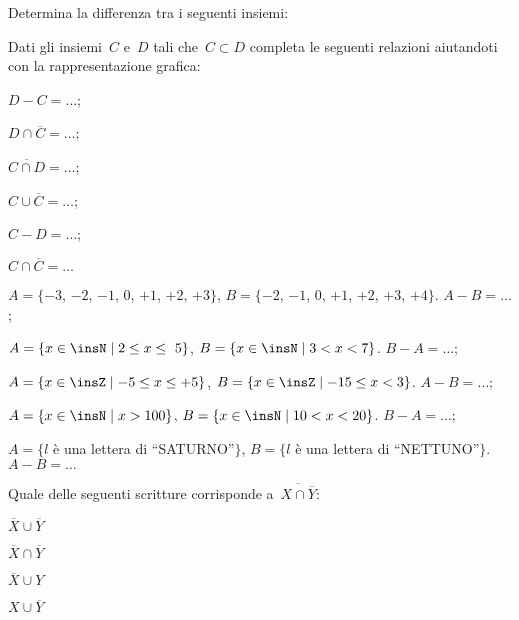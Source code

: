 \begin{esercizio}
Determina la differenza tra i seguenti insiemi:

\begin{esercizio}
Dati gli insiemi~$C$ e~$D$ tali che~$C\subset D$
completa le seguenti relazioni aiutandoti con la rappresentazione
grafica:
\begin{multicols}{3}
\begin{enumeratea}
\item $D-C=\ldots$;
\item $D\cap \overline{C}=\ldots$;
\item $\overline{C\cap D}=\ldots$;
\item $C\cup \overline{C}=\ldots$;
\item $C-D=\ldots$;
\item $C\cap \overline{C}=\ldots$
\end{enumeratea}
\end{multicols}
\end{esercizio}

\begin{enumeratea}
\item $A=\{-3$, $-2$, $-1$, $0$, $+1$, $+2$, $+3\}$, $B=\{-2$, $-1$, $0$, $+1$, $+2$, $+3$, $+4\}$. $A-B=\ldots$;
\item $A=\{x\in\insN\mid 2\le x\le~5\}$, $B=\{x\in\insN\mid 3<x<7\}$. $B-A=\ldots$;
\item $A=\{x\in\insZ\mid -5\le x\le +5\}$, $B=\{x\in\insZ\mid -15\le x<3\}$. $A-B=\ldots$;
\item $A=\{x\in\insN\mid x>100\}$, $B=\{x\in\insN\mid 10<x<20\}$. $B-A=\ldots$;
\item $A=\{l$ è una lettera di ``SATURNO''$\}$, $B=\{l$ è una lettera di ``NETTUNO''$\}$. $A-B=\ldots$
\end{enumeratea}
\end{esercizio}
\pagebreak
\begin{esercizio}
Quale delle seguenti scritture corrisponde a~$\overline{{X\cap \overline{Y}}}$:
\begin{multicols}{4}
 \begin{enumeratea}
 \item $\overline{X}\cup \overline{Y}$
 \item $\overline{X}\cap \overline{Y}$
 \item $\overline{X}\cup Y$
 \item $X\cup \overline{Y}$
 \end{enumeratea}
\end{multicols}
\end{esercizio}


